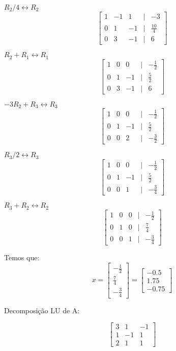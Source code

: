 \documentclass[leqno]{article}
\numberwithin{equation}{section}
\begin{document}
\begin{enumerate}
\begin{sol}
		$R_2/4 \longleftrightarrow R_2$
		$$\begin{bmatrix}
			1 & -1 & 1 & | & -3\\
			0 & 1 & -1 & | & \frac{10}{4}\\
			0 & 3 & -1 & | & 6
		\end{bmatrix}$$
	
		$R_2 + R_1 \longleftrightarrow R_1$
		$$\begin{bmatrix}
			1 & 0 & 0 & | & -\frac{1}{2}\\
			0 & 1 & -1 & | & \frac{5}{2}\\
			0 & 3 & -1 & | & 6
		\end{bmatrix}$$
	
		$-3R_2 + R_3 \longleftrightarrow R_3$
		$$\begin{bmatrix}
			1 & 0 & 0 & | & -\frac{1}{2}\\
			0 & 1 & -1 & | & \frac{5}{2}\\
			0 & 0 & 2 & | & -\frac{3}{2}
		\end{bmatrix}$$
	
		$R_3/2 \longleftrightarrow R_3$
		$$\begin{bmatrix}
			1 & 0 & 0 & | & -\frac{1}{2}\\
			0 & 1 & -1 & | & \frac{5}{2}\\
			0 & 0 & 1 & | & -\frac{3}{4}
		\end{bmatrix}$$
	
		$R_3 + R_2 \longleftrightarrow R_2$
		$$\begin{bmatrix}
			1 & 0 & 0 & | & -\frac{1}{2}\\
			0 & 1 & 0 & | & \frac{7}{4}\\
			0 & 0 & 1 & | & -\frac{3}{4}
		\end{bmatrix}$$
	
		Temos que:
		$$x = \begin{bmatrix}
			-\frac{1}{2} \\
			\frac{7}{4} \\
			-\frac{3}{4}
		\end{bmatrix} = \begin{bmatrix}
		-0.5 \\
		1.75 \\
		-0.75
		\end{bmatrix}$$
	
		Decomposição LU de A:
		
		$$\begin{bmatrix}
			3 & 1 & -1 \\
			1 & -1 & 1 \\
			2 & 1 & 1 
		\end{bmatrix}$$
	

\end{sol}
\end{enumerate}
\end{document}
